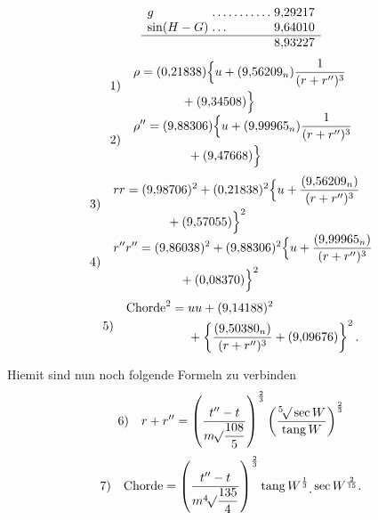 \[
\begin{array}{l@{\;}l@{\;}r}
g&\mathord{.}\,\mathord{.}\,\mathord{.}\,\mathord{.}\,\mathord{.}\,\mathord{.}\,\mathord{.}\,\mathord{.}\,\mathord{.}\,\mathord{.}\,\mathord{.}&9{,}29217\\
\sin(H-G)&\mathord{.}\,\mathord{.}\,\mathord{.}&9{,}64010\\\hline
&&8{,}93227
\end{array}
\]
\[
\begin{array}{l@{\quad}l}
1)&\begin{aligned}\rho={}&(0{,}21838)\Bigl\{u+(9{,}56209_n)\frac{1}{(r+r'')^3}\\
&\qquad{}+(9{,}34508)\Bigr\}\end{aligned}\\[7pt]
2)&\begin{aligned}\rho''={}&(9{,}88306)\Bigl\{u+(9{,}99965_n)\frac{1}{(r+r'')^3}\\
&\qquad{}+(9{,}47668)\Bigr\}\end{aligned}
\end{array}
\]
\[
\begin{array}{l@{\quad}l}
3)&\begin{aligned}rr={}&(9{,}98706)^2+(0{,}21838)^2\Bigl\{u+\frac{(9{,}56209_n)}{(r+r'')^3}\\
&\qquad{}+(9{,}57055)\Bigr\}^2\end{aligned}\\[7pt]
4)&\begin{aligned}r''r''={}&(9{,}86038)^2+(9{,}88306)^2\Bigl\{u+\frac{(9{,}99965_n)}{(r+r'')^3}\\
&\qquad{}+(0{,}08370)\Bigr\}^2\end{aligned}
\end{array}
\]
\[
\begin{array}{l@{\quad}l}
5)&\begin{aligned}\text{Chorde}^2={}&uu+(9{,}14188)^2\\
&+\left\{\frac{(9{,}50380_n)}{(r+r'')^3}+(9{,}09676)\right\}^2.
\end{aligned}
\end{array}
\]

Hiemit sind nun noch folgende Formeln zu verbinden
\[
\begin{array}{l@{\quad}l}
6)&\displaystyle r+r''=\left(\frac{t''-t}{m\BareRoot{\dfrac{108}{5}}}\right)^{\frac{2}{3}}\left(\frac{\BareRoot[5]{\sec W}}{\operatorname{tang}W}\right)^{\frac{2}{3}}
\end{array}
\]
\[
\begin{array}{l@{\quad}l}
7)&\displaystyle\text{Chorde}=\left(\frac{t''-t}{m\BareRoot[4]{\dfrac{135}{4}}}\right)^{\frac{2}{3}}\operatorname{tang}W^{\frac{1}{3}}\mathord{\raisebox{-.6ex}{.}}\sec W^{\frac{2}{15}}.
\end{array}
\]

